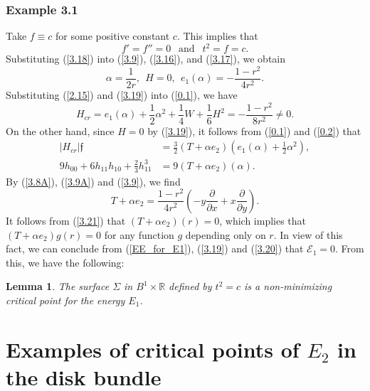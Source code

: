 \documentclass{amsart}
\newtheorem{lem}[theorem]{Lemma}
\theoremstyle{Corollary}
\numberwithin{equation}{section}
\begin{document}
\subsubsection{Example 3.1} Take $f\equiv c$ for some positive constant $c$. 
This implies that 
\begin{equation}\label{3.18}
f'=f''=0~~\mbox{ and }~~t^2=f=c. 
\end{equation}
Substituting (\ref{3.18}) into 
(\ref{3.9}), (\ref{3.16}), and (\ref{3.17}), we obtain 
\begin{equation}\label{3.19}
\alpha=\frac{1}{2r},~~H=0,~~e_1(\alpha)=-\frac{1-r^2}{4r^2}.
\end{equation}
Substituting (\ref{2.15}) and (\ref{3.19}) into (\ref{0.1}), 
we have
$$H_{cr}=e_1(\alpha)+\frac{1}{2}\alpha^2+\frac{1}{4}W+\frac{1}{6}H^2
=-\frac{1-r^2}{8r^2}\neq 0.$$
On the other hand, since $H=0$ by (\ref{3.19}), 
it follows from (\ref{0.1}) and (\ref{0.2}) that 
\begin{equation}\label{3.20}
\begin{split}
|H_{cr}|\mathfrak{f}&=\frac{3}{2}(T+\alpha e_2)\left(e_1(\alpha)+\frac{1}{2}\alpha^2\right),\\
9h_{00}+6h_{11}h_{10}+\frac{2}{3}h_{11}^3
&=9(T+\alpha e_2)(\alpha).
\end{split}
\end{equation}
By (\ref{3.8A}),  (\ref{3.9A}) and (\ref{3.9}), we find 
\begin{equation}\label{3.21}
T+\alpha e_2=\frac{1-r^2}{4r^2}\left(-y\frac{\partial}{\partial x}+x\frac{\partial}{\partial y}\right). 
\end{equation}
It follows from (\ref{3.21}) that 
$(T+\alpha e_2)(r)=0$, which implies that 
$(T+\alpha e_2)g(r)=0$ for any function $g$ depending only on $r$. 
In view of this fact, we can conclude 
from (\ref{EE_for_E1}),  (\ref{3.19}) and (\ref{3.20})
that $\mathcal{E}_1=0$. 
From this, we have the following: 

\begin{lem}\label{lem3.4}
The surface 
$\Sigma$ in $B^1\times\mathbb{R}$ defined by 
$t^2=c$ is a non-minimizing critical point for the energy $E_1$. 
\end{lem}






\section{Examples of critical points of $E_2$
in the disk bundle}\label{section4}
\end{document}
